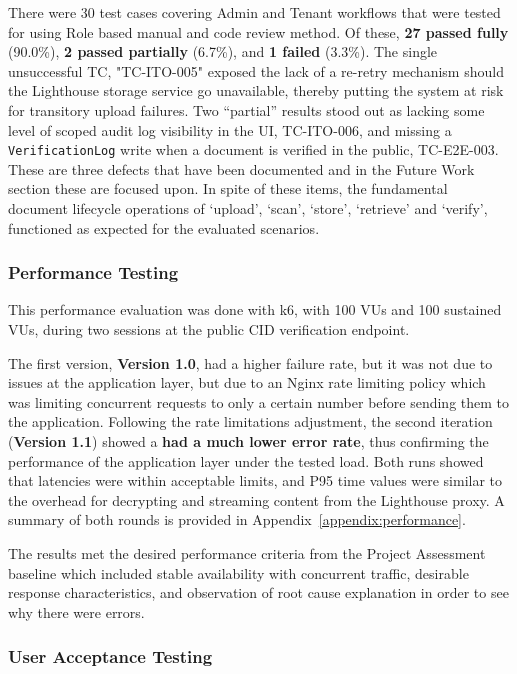 There were 30 test cases covering Admin and Tenant workflows that were tested for using Role based manual and code review method. Of these, \textbf{27 passed fully} (90.0\%), \textbf{2 passed partially} (6.7\%), and \textbf{1 failed} (3.3\%). The single unsuccessful TC, "TC-ITO-005" exposed the lack of a re-retry mechanism should the Lighthouse storage service go unavailable, thereby putting the system at risk for transitory upload failures. Two “partial” results stood out as lacking some level of scoped audit log visibility in the UI, TC-ITO-006, and missing a \texttt{VerificationLog} write when a document is verified in the public, TC-E2E-003. These are three defects that have been documented and in the Future Work section these are focused upon. In spite of these items, the fundamental document lifecycle operations of ‘upload', ‘scan', ‘store', ‘retrieve' and ‘verify', functioned as expected for the evaluated scenarios.

\subsubsection{Performance Testing}

This performance evaluation was done with k6, with 100 VUs and 100 sustained VUs, during two sessions at the public CID verification endpoint.

The first version, \textbf{Version 1.0}, had a higher failure rate, but it was not due to issues at the application layer, but due to an Nginx rate limiting policy which was limiting concurrent requests to only a certain number before sending them to the application. Following the rate limitations adjustment, the second iteration (\textbf{Version 1.1}) showed a \textbf{had a much lower error rate}, thus confirming the performance of the application layer under the tested load. Both runs showed that latencies were within acceptable limits, and P95 time values were similar to the overhead for decrypting and streaming content from the Lighthouse proxy.
A summary of both rounds is provided in
Appendix~\ref{appendix:performance}.

The results met the desired performance criteria from the Project Assessment baseline which included stable availability with concurrent traffic, desirable response characteristics, and observation of root cause explanation in order to see why there were errors.

\subsubsection{User Acceptance Testing}

